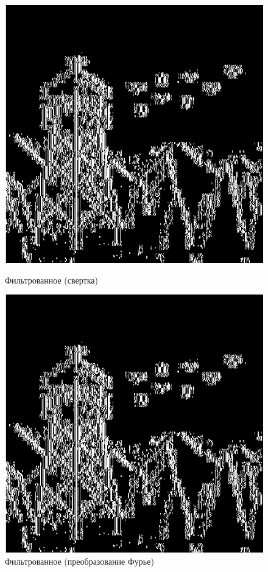 \documentclass[a4paper]{article}
\begin{document}
\begin{figure}[H]
    \begin{minipage}{0.49\textwidth}
        \centering \includegraphics[width=\textwidth]{2/img_laplacian_by_conv2.png}
        \caption{Фильтрованное (свертка)}
    \end{minipage}
    \begin{minipage}{0.49\textwidth}
        \centering \includegraphics[width=\textwidth]{2/img_laplacian_by_fourier.png}
        \caption{Фильтрованное (преобразование Фурье)}
    \end{minipage}
\end{figure}\noindent\
\end{document}
